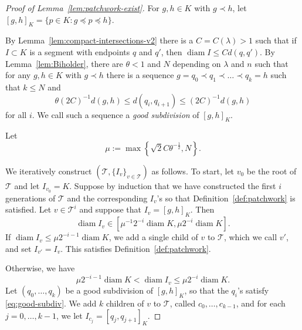 \documentclass[12pt,reqno]{amsart}
\newcommand{\cT}{\mathcal{T}}
\theoremstyle{remark}
\newcommand{\0}{\mathbf{0}}
\renewcommand{\1}{\mathbf 1}
\DeclareMathOperator{\diam}{diam}
\begin{document}
\begin{proof}[Proof of Lemma~\ref{lem:patchwork-exist}]  
  For $g,h\in K$ with $g\prec h$, let $[g,h]_K = \{ p \in K : g \preceq p \preceq h\}$.
  
  By Lemma~\ref{lem:compact-intersections-v2} there is a $C=C(\lambda)>1$ such that if $I\subset K$ is a segment with endpoints $q$ and $q'$, then $\diam I \le C d(q,q')$. By Lemma~\ref{lem:Biholder}, there are $\theta<1$ and $N$ depending on $\lambda$ and $n$ such that for any $g,h\in K$ with $g\prec h$ there is a sequence $g=q_0\prec q_1\prec \ldots\prec q_k=h$ such that $k\le N$ and
  \begin{equation}\label{eq:good-subdiv}
    \theta (2C)^{-1}d(g,h) \le d(q_i,q_{i+1})\leq (2C)^{-1} d(g,h)
  \end{equation}
  for all $i$. We call such a sequence a \emph{good subdivision} of $[g,h]_K$.  

  Let 
  \begin{equation}\label{eq:def-mu}
    \mu:=\max\left\{\sqrt{2} C \theta^{-\frac{1}{2}},N\right\}.
  \end{equation}
    
  We iteratively construct $(\cT, \{I_v\}_{v\in \cT})$ as follows. To start, let $v_0$ be the root of $\cT$ and let $I_{v_0} = K$. Suppose by induction that we have constructed the first $i$ generations of $\cT$ and the corresponding $I_v$'s so that Definition~\ref{def:patchwork} is satisfied. Let $v\in \cT^i$ and suppose that $I_v = [g,h]_K$. Then
  \begin{equation}\label{eq:patch-diamNew}
    \diam I_v\in [\mu^{-1} 2^{-i}\diam K, \mu 2^{-i}\diam K].
  \end{equation}
  If $\diam I_v \le \mu 2^{-i-1}\diam K$, we add a single child of $v$ to $\cT$, which we call $v'$, and set $I_{v'} = I_v$. This satisfies Definition~\ref{def:patchwork}.

  Otherwise, we have
  \begin{equation}\label{eq:Iv-bound}
    \mu 2^{-i-1}\diam K < \diam I_v \le \mu 2^{-i}\diam K.
  \end{equation}
  Let $(q_0,\dots, q_k)$ be a good subdivision of $[g,h]_K$, so that the $q_i$'s satisfy \eqref{eq:good-subdiv}.
  We add $k$ children of $v$ to $\cT$, called $c_0,\dots, c_{k-1}$,
  and for each $j=0,\dots,k-1$, we let $I_{c_j} = [q_{j},q_{j+1}]_K$.


\end{proof}
\end{document}

